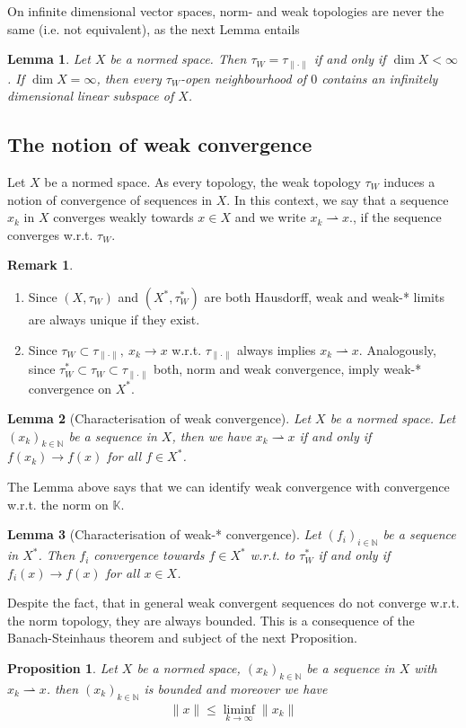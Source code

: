 \documentclass[11pt,a4paper]{article}
\newtheorem{lem}{Lemma}[section]
\newtheorem{prop}{Proposition}[section]
\theoremstyle{definition}
\newtheorem{rem}{Remark}[section]
\newcommand{\wto}{\rightharpoonup}
\begin{document}
\newpage
\noindent On infinite dimensional vector spaces, norm- and weak topologies are never the same (i.e. not equivalent), as the next Lemma entails
\begin{lem} Let $X$ be a normed space. Then $\tau_W = \tau_{\| \cdot \|}$ if and only if $\dim X < \infty$. If $\dim X = \infty$, then every $\tau_W$-open neighbourhood of $0$ contains an infinitely dimensional linear subspace of $X$. 
\end{lem}
\subsection{The notion of weak convergence}
Let $X$ be a normed space. As every topology, the weak topology $\tau_W$ induces a notion of convergence of sequences in $X$. In this context, we say that a sequence $x_k$ in $X$ converges weakly towards $x \in X$ and we write $x_k \rightharpoonup x.$, if the sequence converges w.r.t. $\tau_W$. 
\begin{rem} \
\begin{enumerate}
\item Since $(X, \tau_W)$ and $(X^*, \tau_W^*)$ are both Hausdorff, weak and weak-* limits are always unique if they exist. 
\item Since $\tau_W \subset \tau_{\| \cdot \|}, \ x_k \to x$ w.r.t. $\tau_{\| \cdot \|}$ always implies $x_k \wto x$. Analogously, since $\tau_W^* \subset \tau_W \subset \tau_{\| \cdot \|}$ both, norm and weak convergence, imply weak-* convergence on $X^*$. 
\end{enumerate}
\end{rem}
\begin{lem}[Characterisation of weak convergence] Let $X$ be a normed space. Let $(x_k)_{k \in \mathbb{N}}$ be a sequence in $X$, then we have $x_k \wto x$ if and only if $f(x_k) \to f(x)$ for all $f \in X^*$.
\end{lem}
\noindent The Lemma above says that we can identify weak convergence with convergence w.r.t. the norm on $\mathbb{K}$. 
\begin{lem}[Characterisation of weak-* convergence] Let $(f_i)_{i \in \mathbb{N}}$ be a sequence in $X^*$. Then $f_i$ convergence towards $f \in X^*$ w.r.t. to $\tau_W^*$ if and only if $f_i(x) \to f(x)$ for all $x \in X$.
\end{lem}
\noindent Despite the fact, that in general weak convergent sequences do not converge w.r.t. the norm topology, they are always bounded. This is a consequence of the Banach-Steinhaus theorem and subject of the next Proposition. 
\begin{prop} Let $X$ be a normed space, $(x_k)_{k \in \mathbb{N}}$ be a sequence in $X$ with $x_k \wto x$. then $(x_k)_{k \in \mathbb{N}}$ is bounded and moreover we have 
\begin{align*}
\| x \| \leq \liminf_{k \to \infty} \|x_k\|
\end{align*}
\end{prop}
\newpage
\end{document}

